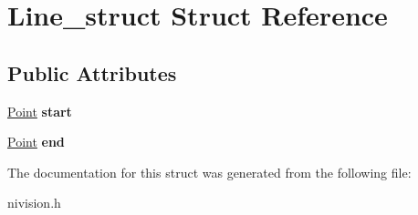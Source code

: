 \hypertarget{structLine__struct}{
\section{Line\_\-struct Struct Reference}
\label{structLine__struct}
}
\subsection*{Public Attributes}
\begin{DoxyCompactItemize}
\item 
\hypertarget{structLine__struct_a4188f5cd46478e95d68e378b2b76e0f8}{
\hyperlink{structPoint__struct}{Point} {\bfseries start}}
\label{structLine__struct_a4188f5cd46478e95d68e378b2b76e0f8}

\item 
\hypertarget{structLine__struct_af93af7c83466ef8080d460336bb603d6}{
\hyperlink{structPoint__struct}{Point} {\bfseries end}}
\label{structLine__struct_af93af7c83466ef8080d460336bb603d6}

\end{DoxyCompactItemize}


The documentation for this struct was generated from the following file:\begin{DoxyCompactItemize}
\item 
nivision.h\end{DoxyCompactItemize}
